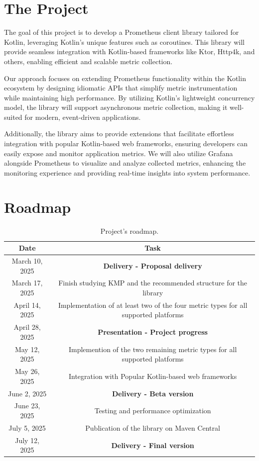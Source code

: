 \documentclass[a4paper,twoside,11pt]{article}
\begin{document}
\section{The Project}
The goal of this project is to develop a Prometheus client library tailored for Kotlin, leveraging Kotlin's unique features such as coroutines. This library will provide seamless integration with Kotlin-based frameworks like Ktor, Http4k, and others, enabling efficient and scalable metric collection.

Our approach focuses on extending Prometheus functionality within the Kotlin ecosystem by designing idiomatic APIs that simplify metric instrumentation while maintaining high performance. By utilizing Kotlin’s lightweight concurrency model, the library will support asynchronous metric collection, making it well-suited for modern, event-driven applications.

Additionally, the library aims to provide extensions that facilitate effortless integration with popular Kotlin-based web frameworks, ensuring developers can easily expose and monitor application metrics. We will also utilize Grafana alongside Prometheus to visualize and analyze collected metrics, enhancing the monitoring experience and providing real-time insights into system performance.

\section{Roadmap}
\begin{table}[h!]
\centering
\begin{tabular}{ |c||c|  }
  \hline
  Date &Task\\
  \hline
  March 10, 2025   & \textbf{Delivery - Proposal delivery}\\
  \hline
  March 17, 2025  & Finish studying KMP and the recommended structure for the library \\
  \hline
  April 14, 2025  &Implementation of at least two of the four metric types for all supported platforms\\
  \hline
  April 28, 2025&   \textbf{Presentation - Project progress}\\
  \hline
  May 12, 2025&   Implemention of the two remaining metric types for all supported platforms\\
  \hline
  May 26, 2025&   Integration with Popular Kotlin-based web frameworks\\
  \hline
  June 2, 2025 &\textbf{Delivery - Beta version}\\
  \hline
  June 23, 2025 &Testing and performance optimization\\
  \hline
  July 5, 2025 &Publication of the library on Maven Central\\
  \hline
  July 12, 2025    &\textbf{Delivery - Final version}\\
  \hline
 \end{tabular}
 \caption{Project's roadmap.}
 \label{table:2}
\end{table}



\end{document}
